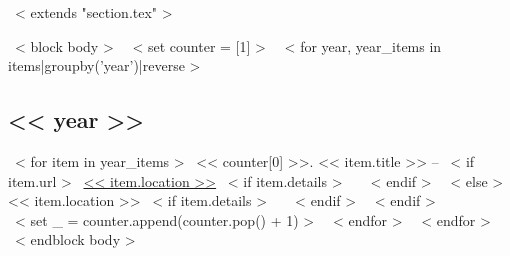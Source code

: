 ~< extends "section.tex" >~

~< block body >~
  ~< set counter = [1] >~
  ~< for year, year_items in items|groupby('year')|reverse >~
    \subsection*{<< year >>}
    ~< for item in year_items >~
      << counter[0] >>. << item.title >> -- ~< if item.url >~
        \href{<< item.url >>}{<< item.location >>}
        ~< if item.details >~
        \,\, {\scriptsize
          \color{gray}{<< item.details >>}
        }
        ~< endif >~
      ~< else >~
        << item.location >>
        ~< if item.details >~
        \,\, {\scriptsize
          \color{gray}{<< item.details >>}
        }
        ~< endif >~
      ~< endif >~
      \\[0.5mm]
      ~< set _ = counter.append(counter.pop() + 1) >~
    ~< endfor >~
  ~< endfor >~
~< endblock body >~